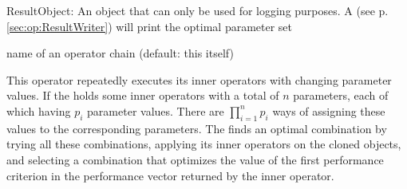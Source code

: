 \begin{opout}
\item [ResultObject:] An object that can only be used for logging
  purposes. A  (see p. \ref{sec:op:ResultWriter})
  will print the optimal parameter set
\end{opout}

\begin{parameters}
\optpar[operator] name of an operator chain (default: this
 itself)
\end{parameters}

\opdescr This operator repeatedly executes its inner operators with changing parameter values. 
If the  holds some inner operators with a total of $n$ parameters, 
each of which having $p_i$ parameter values. 
There are $\prod_{i=1}^{n}p_i$ ways of assigning these values to the corresponding parameters. 
The  finds an optimal combination by
trying all these combinations, applying its inner operators on the cloned objects, 
and selecting a combination that optimizes the value of the first performance criterion 
in the performance vector returned by the inner operator.


